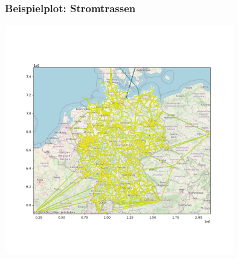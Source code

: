 \documentclass[aspectratio=169,t]{beamer}
\begin{document}
	\begin{frame}
		\frametitle{Beispielplot: Stromtrassen}
		\vspace*{-1.3cm}
		\hspace*{6cm}
		\includegraphics[height=10cm]{./line.png}
	\end{frame}

	
	
\end{document}
